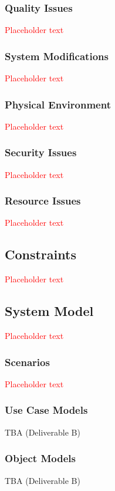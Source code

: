 \documentclass[a4paper, 11pt, titlepage]{article}
\begin{document}
\subsubsection{Quality Issues}
\textcolor{red}{Placeholder text}

\subsubsection{System Modifications}
\textcolor{red}{Placeholder text}

\subsubsection{Physical Environment}
\textcolor{red}{Placeholder text}

\subsubsection{Security Issues}
\textcolor{red}{Placeholder text}

\subsubsection{Resource Issues}
\textcolor{red}{Placeholder text}

\subsection{Constraints}
\textcolor{red}{Placeholder text}

\subsection{System Model}
\textcolor{red}{Placeholder text}

\subsubsection{Scenarios}
\textcolor{red}{Placeholder text}

\subsubsection{Use Case Models}
TBA (Deliverable B)

\subsubsection{Object Models}
TBA (Deliverable B)
\end{document}
